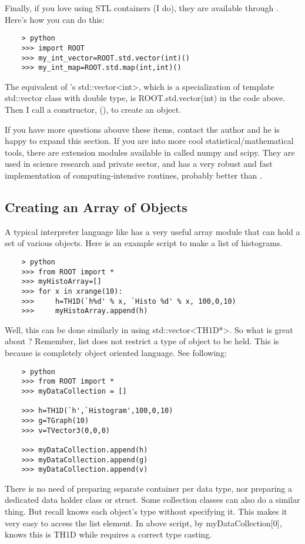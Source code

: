 Finally, if you love using {\ttfamily STL} containers (I do), they are available through \PyROOT.
Here's how you can do this:
\begin{lstlisting}
    > python
    >>> import ROOT
    >>> my_int_vector=ROOT.std.vector(int)()
    >>> my_int_map=ROOT.std.map(int,int)()
\end{lstlisting}
The equivalent of \CPP's {\ttfamily std::vector<int>}, which is a specialization of template {\ttfamily std::vector} class
with {\ttfamily double} type, is {\ttfamily ROOT.std.vector(int)} in the code above. Then I call a constructor, {\ttfamily ()},
to create an object.

If you have more questions abouve these items, contact the author and he is happy to expand this section.
If you are into more cool statistical/mathematical tools, there are extension modules available in \python called 
{\ttfamily numpy} and {\ttfamily scipy}. They are used in science research and private sector, and has a very
robust and fast implementation of computing-intensive routines, probably better than \ROOT.

\subsection{Creating an Array of Objects}
A typical interpreter language like \python has a very useful array module that can hold a set
of various objects. Here is an example \python script to make a list of histograms.
\begin{lstlisting}
    > python
    >>> from ROOT import *
    >>> myHistoArray=[]
    >>> for x in xrange(10):
    >>>     h=TH1D(`h%d' % x, `Histo %d' % x, 100,0,10)
    >>>     myHistoArray.append(h)
\end{lstlisting}
Well, this can be done similarly in \CINT using {\ttfamily std::vector<TH1D*>}. So what is
great about \python? Remember, \python list does not restrict a type of object to be held.
This is because \python is completely object oriented language. See following:
\begin{lstlisting}
    > python
    >>> from ROOT import *
    >>> myDataCollection = []

    >>> h=TH1D(`h',`Histogram',100,0,10)
    >>> g=TGraph(10)
    >>> v=TVector3(0,0,0)

    >>> myDataCollection.append(h)
    >>> myDataCollection.append(g)
    >>> myDataCollection.append(v)

\end{lstlisting}
There is no need of preparing separate container per data type, nor preparing a dedicated
data holder {\ttfamily class} or {\ttfamily struct}. Some \ROOT collection classes can 
also do a similar thing. But recall \python knows each object's type without specifying it.
This makes it very easy to access the list element. In above script, by
{\ttfamily myDataCollection[0]}, \python knows this is TH1D while \CINT requires a correct
type casting.\\

